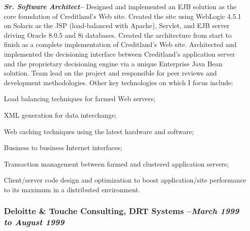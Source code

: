 \documentclass[10pt]{report}
\begin{document}
  \begin{description}

    \item{\bf{\emph{Sr. Software Architect--}}} Designed and implemented an EJB
    solution as the core foundation of Creditland's Web site.  Created the  site
    using WebLogic 4.5.1 on Solaris as the JSP (load-balanced with  Apache),
    Servlet, and EJB server driving Oracle 8.0.5 and 8i databases.   Created the
    architecture from start to finish as a complete implementation  of
    Creditland's Web site.  Architected and implemented the decisioning
    interface between Creditland's  application server and the proprietary
    decisioning engine via a unique  Enterprise Java Bean solution.  Team lead
    on the project and responsible  for peer reviews and development
    methodologies.  Other key technologies on which I focus include:

    	\begin{list}{-}{}

    		\item Load balancing techniques for farmed Web servers;

    		\item XML generation for data interchange;

    		\item Web caching techniques using the latest hardware and software;

    		\item Business to business Internet interfaces;

    		\item Transaction management between farmed and clustered application servers;

    		\item Client/server code design and optimization to boost application/site performance to its maximum in a distributed environment.

    	\end{list}

 \end{description}

  \subsubsection*{Deloitte \& Touche Consulting, DRT Systems --\emph{March 1999 to August 1999}}
\end{document}
